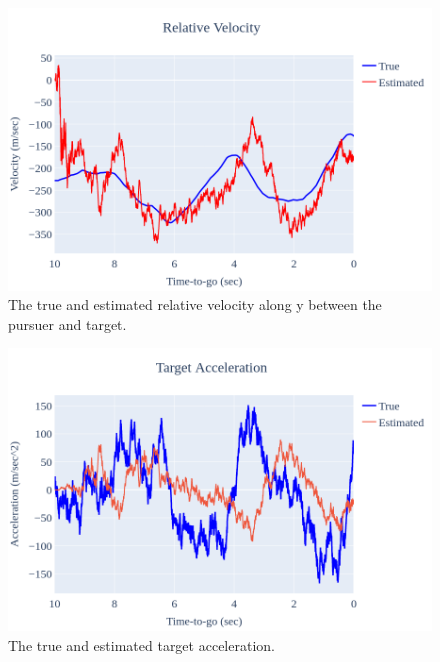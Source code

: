 \documentclass{article}
\begin{document}
\begin{figure}
    \centering
    \includegraphics[width=1\textwidth]{figv.png}
    \caption{The true and estimated relative velocity along y between the pursuer and target.}
    \label{Relative_Velocity}
\end{figure}

\begin{figure}
    \centering
    \includegraphics[width=1\textwidth]{figat.png}
    \caption{The true and estimated target acceleration.}
    \label{Target_acceleration}
\end{figure}
\end{document}
